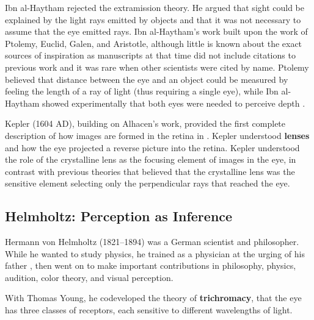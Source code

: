Ibn al-Haytham rejected the extramission theory. He argued that sight could be explained by the light rays emitted by objects and that it was not necessary to assume that the eye emitted rays. Ibn al-Haytham's work built upon the work of Ptolemy, Euclid, Galen, and Aristotle, although little is known about the exact sources of inspiration as manuscripts at that time did not include citations to previous work and it was rare when other scientists were cited by name. Ptolemy believed that distance between the eye and an object could be measured by feeling the length of a ray of light (thus requiring a single eye), while Ibn al-Haytham showed experimentally that both eyes were needed to perceive depth \cite{2001alhacen}.



Kepler (1604 AD), building on Alhacen's work, provided the first complete description of how images are formed in the retina in  
\cite{Martens2001-MAROPT-2}. Kepler understood {\bf lenses} and how the eye projected a reverse picture into the retina. Kepler understood the role of the crystalline lens as the focusing element of images in the eye, in contrast with previous theories that believed that the crystalline lens was the sensitive element selecting only the perpendicular rays that reached the eye.  



\subsection{Helmholtz: Perception as Inference}


Hermann von Helmholtz (1821--1894) was a German scientist and philosopher. While he wanted to study physics, he trained as a physician at the urging of his father \cite{Shapin2019}, then went on to make important contributions in philosophy, physics, audition, color theory, and visual perception.


With Thomas Young, he codeveloped the theory of {\bf trichromacy}, 
that the eye has three classes of receptors, each sensitive to different wavelengths of light.  


